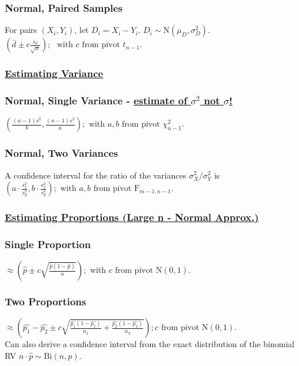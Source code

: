 \documentclass{article}
\begin{document}
\begin{multicols*}{2}
\subsubsection*{Normal, Paired Samples}
For pairs $(X_{i}, Y_{i})$, let $D_{i} = X_{i} - Y_{i}$. $D_{i} \sim \mbox{N}(\mu_{D}, \sigma_{D}^{2}).$\\
$ \left( \bar{d} \pm c \frac{s_{d}}{\sqrt{n}} \right);$ \underline{$\mbox{ with } c \mbox{ from pivot } t_{n-1}.$}

\subsubsection*{\underline{Estimating Variance}}
\subsubsection*{Normal, Single Variance - \underline{\color{red} estimate of $\sigma^{2}$ not $\sigma$!}}
$ \left( \frac{(n-1) s^{2}}{b}, \frac{(n-1) s^{2}}{a} \right); \mbox{ with } a, b \mbox{ from pivot } \chi^{2}_{n-1}.$
\subsubsection*{Normal, Two Variances}
A confidence interval for the ratio of the variances $\sigma_{X}^{2} / \sigma_{Y}^{2}$ is
$ \left( a \cdot \frac{s_{x}^{2}}{s_{y}^{2}}, b \cdot \frac{s_{x}^{2}}{s_{y}^{2}} \right); \mbox{ with } a, b \mbox{ from pivot } \mbox{F}_{m-1,n-1}.$

\subsubsection*{\underline{Estimating Proportions (Large n - Normal Approx.)}}
\subsubsection*{Single Proportion}
$ \approx \left( \hat{p} \pm c \sqrt{\frac{\hat{p} (1-\hat{p})}{n}} \right); \mbox{ with } c \mbox{ from pivot } \mbox{N}(0, 1).$
\subsubsection*{Two Proportions}
$ \approx \left( \hat{p_{1}} - \hat{p_{2}} \pm c \sqrt{\frac{\hat{p_{1}} (1-\hat{p_{1}})}{n_{1}} + \frac{\hat{p_{2}} (1-\hat{p_{2}})}{n_{2}}} \right); c \mbox{ from pivot } \mbox{N}(0, 1).$\\
Can also derive a confidence interval from the exact distribution of the binomial RV $n \cdot \hat{p} \sim \mbox{Bi}(n, p)$.


\end{multicols*}
\end{document}

